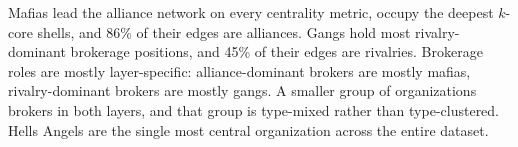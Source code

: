 \documentclass[11pt,a4paper]{article}
\begin{document}
Mafias lead the alliance network on every centrality metric, occupy the deepest $k$-core shells, and 86\% of their edges are alliances. Gangs hold most rivalry-dominant brokerage positions, and 45\% of their edges are rivalries. Brokerage roles are mostly layer-specific: alliance-dominant brokers are mostly mafias, rivalry-dominant brokers are mostly gangs. A smaller group of organizations brokers in both layers, and that group is type-mixed rather than type-clustered. Hells Angels are the single most central organization across the entire dataset.

% 
% 
\end{document}
